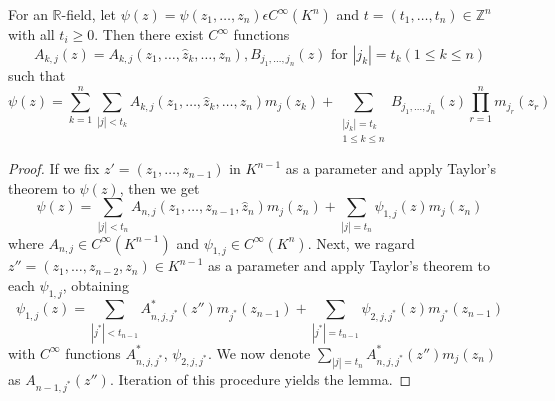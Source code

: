 \setcounter{lemma}{4}
\begin{lemma}\label{chap3:sec4:subsec5:lem5} %
For an $\mathbb{R}$-field, let
$\psi(z)=\psi(z_{1},\ldots,z_{n})\epsilon C^{\infty}(K^{n})$ and
$t=(t_{1},\ldots,t_{n})\in\mathbb{Z}^{n}$ with all $t_{i}\geq 0$. Then
there exist $C^{\infty}$ functions
$$
A_{k,j}(z)=A_{k,j}(z_{1},\ldots,\hat{z}_{k}, \ldots,z_{n}),
B_{j_{1},\ldots,j_{n}}(z)\text{ for } |j_{k}|=t_{k}(1\leq k\leq n) 
$$
such that
\begin{equation*}
  \psi(z) = \sum^{n}_{k=1}
  \sum_{|j|<t_{k}}A_{k,j}(z_{1},\ldots, \hat{z}_{k}, \ldots,z_{n})m_{j}
  (z_{k}) +\sum_{\substack{|j_{k}|=t_{k}\\ 1\leq
      k\leq n}}  B_{j_{1},\ldots,j_{n}}(z) \prod^{n}_{r=1}m_{j_{r}}
  (z_{r}) \tag{100}\label{chap3:sec4:subsec5:eq100}  
\end{equation*}
\end{lemma}

\begin{proof}
If we fix $z'=(z_{1},\ldots,z_{n-1})$ in $K^{n-1}$ as a parameter and
apply Taylor's theorem to $\psi(z)$, then we get
$$
\psi(z)=\sum_{|j|<t_{n}}A_{n,j}(z_{1},\ldots,z_{n-1},\hat{z}_{n})m_{j}(z_{n})+\sum_{|j|=t_{n}}\psi_{1,j}(z)m_{j}(z_{n})
$$
where $A_{n,j}\in C^{\infty}(K^{n-1})$ and $\psi_{1,j}\in
C^{\infty}(K^{n})$. Next, we ragard
$z''=(z_{1},\ldots,z_{n-2},z_{n})\in K^{n-1}$ as a parameter and apply
Taylor's theorem to each $\psi_{1,j}$, obtaining
$$
\psi_{1,j}(z)=\sum_{|j^{\ast}|<t_{n-1}}A^{\ast}_{n,j,j^{\ast}}(z'')m_{j^{\ast}}(z_{n-1})+\sum_{|j^{\ast}|=t_{n-1}}\psi_{2,j,j^{\ast}}(z)m_{j^{\ast}}(z_{n-1}) 
$$
with $C^{\infty}$ functions $A^{\ast}_{n,j,j^{\ast}}$,
$\psi_{2,j,j^{\ast}}$. We now denote 
$\sum\limits_{|j|=t_{n}}A^{\ast}_{n,j,j^{\ast}}(z'')m_{j}(z_{n})$\pageoriginale
as $A_{n-1,j^{\ast}}(z'')$. Iteration of this procedure yields the
lemma. 
\end{proof}

